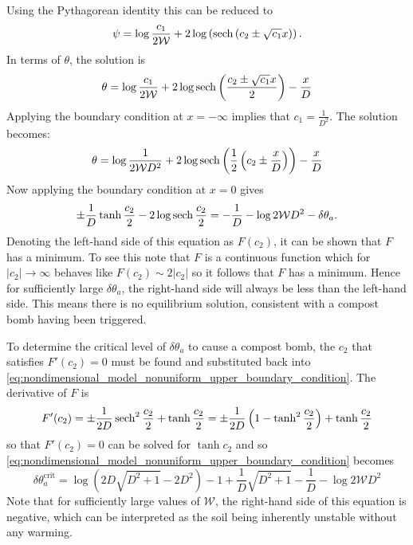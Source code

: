Using the Pythagorean identity\cite{riley2006} this can be reduced to
\begin{equation}
  \psi = \log \frac{c_1}{2\mathcal{W}} + 2\log \left(\sech \left(c_2 \pm \sqrt{c_1} x\right)\right).
\end{equation}
In terms of $\theta$, the solution is
\begin{equation}
  \label{eq:nondimensional_model_nonuniform_solution_general}
  \theta = \log \frac{c_1}{2\mathcal{W}} + 2 \log \sech \left( \frac{c_2 \pm \sqrt{c_1} x}{2}\right) - \frac{x}{D}
\end{equation}
Applying the boundary condition at $x = -\infty$ implies that $c_1 = \frac{1}{D^2}$.  The solution becomes:
\begin{equation}
  \label{eq:nondimensional_model_nonuniform_solution_one_bc}
  \theta = \log \frac{1}{2\mathcal{W}D^2} + 2 \log \sech \left( \frac{1}{2} \left(c_2 \pm \frac{x}{D}\right)\right) - \frac{x}{D}
\end{equation}
Now applying the boundary condition at $x = 0$ gives
\begin{equation}
  \label{eq:nondimensional_model_nonuniform_upper_boundary_condition}
  \pm\frac{1}{D}\tanh \frac{c_2}{2} - 2 \log \sech \frac{c_2}{2} = -\frac{1}{D} - \log 2\mathcal{W}D^2 - \delta\theta_a.
\end{equation}
Denoting the left-hand side of this equation as $F(c_2)$, it can be shown that $F$ has a minimum. To see this note that $F$ is a continuous function which
for $|c_2| \rightarrow \infty$ behaves like $F(c_2) \sim 2|c_2|$ so it follows %
that $F$ has a minimum. Hence for sufficiently large $\delta\theta_a$, the right-hand side will always
be less than the left-hand side. This means there is no equilibrium solution, consistent with a compost bomb having been triggered.

To determine the critical level of $\delta\theta_a$ to cause a compost bomb,
the $c_2$ that satisfies $F'(c_2) = 0$ must be found and substituted back into \cref{eq:nondimensional_model_nonuniform_upper_boundary_condition}. The derivative of $F$
is
\begin{equation}
  F'(c_2) = \pm \frac{1}{2D}\sech^2 \frac{c_2}{2} + \tanh \frac{c_2}{2} = \pm \frac{1}{2D}\left(1 - \tanh^2 \frac{c_2}{2}\right) + \tanh \frac{c_2}{2} 
\end{equation}
so that $F'(c_2) = 0$ can be solved for $\tanh c_2$ and so \cref{eq:nondimensional_model_nonuniform_upper_boundary_condition} becomes
\begin{equation}
  \label{eq:nondimensional_model_nonuniform_critical_warming}
  \delta\theta_a^{\mathrm{crit}} = \log \left(2D\sqrt{D^2 +1} - 2D^2\right) -1 + \frac{1}{D} \sqrt{D^2 + 1} - \frac{1}{D} - \log 2\mathcal{W}D^2
\end{equation}
Note that for sufficiently large values of $\mathcal{W}$, the right-hand side of this equation is negative, which can be interpreted as the soil being inherently unstable without any warming.

